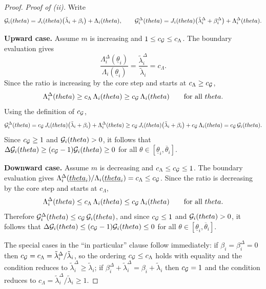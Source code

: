 \documentclass[master.tex]{subfiles}
\begin{document}
\begin{proof}
\noindent\textit{Proof of (ii).}
Write
\[
\mathcal{G}_i(theta) = J_i(theta)\bigl(\tilde\lambda_i+\beta_i\bigr)+\Lambda_i(theta), \qquad \mathcal{G}_i^\Delta(theta) = J_i(theta)\bigl(\tilde\lambda_i^\Delta+\beta_i^{\Delta}\bigr)+\Lambda_i^\Delta(theta).
\]


\noindent\textbf{Upward case.} Assume $m$ is increasing and $1\le c_{\mathcal{G}}\le c_\Lambda$. The boundary evaluation gives
\[
\frac{\Lambda_i^\Delta(\underline\theta_i)}{\Lambda_i(\underline\theta_i)} = \frac{\tilde\lambda_i^\Delta}{\tilde\lambda_i} = c_\Lambda.
\]
Since the ratio is increasing by the core step and starts at $c_\Lambda \ge c_{\mathcal{G}}$,
\[
\Lambda_i^\Delta(theta) \ge c_\Lambda\,\Lambda_i(theta) \ge c_{\mathcal{G}}\,\Lambda_i(theta) \qquad \text{for all }theta.
\]
Using the definition of $c_{\mathcal{G}}$,
\[
\mathcal{G}_i^\Delta(theta) = c_{\mathcal{G}}\,J_i(theta)\bigl(\tilde\lambda_i+\beta_i\bigr)+\Lambda_i^\Delta(theta) \ge c_{\mathcal{G}}\,J_i(theta)\bigl(\tilde\lambda_i+\beta_i\bigr)+c_{\mathcal{G}}\,\Lambda_i(theta) = c_{\mathcal{G}}\,\mathcal{G}_i(theta).
\]
Since $c_{\mathcal{G}}\ge 1$ and $\mathcal{G}_i(theta)>0$, it follows that $\Delta\mathcal{G}_i(theta) \ge (c_{\mathcal{G}}-1)\mathcal{G}_i(theta) \ge 0$ for all $\theta\in[\underline\theta_i,\overline\theta_i]$.


\noindent\textbf{Downward case.} Assume $m$ is decreasing and $c_\Lambda\le c_{\mathcal{G}}\le 1$. The boundary evaluation gives $\Lambda_i^\Delta(\underline{theta}_i)/\Lambda_i(\underline{theta}_i) = c_\Lambda \le c_{\mathcal{G}}$. Since the ratio is decreasing by the core step and starts at $c_\Lambda$,
\[
\Lambda_i^\Delta(theta) \le c_\Lambda\,\Lambda_i(theta) \le c_{\mathcal{G}}\,\Lambda_i(theta) \qquad \text{for all }theta.
\]
Therefore $\mathcal{G}_i^\Delta(theta) \le c_{\mathcal{G}}\,\mathcal{G}_i(theta)$, and since $c_{\mathcal{G}}\le 1$ and $\mathcal{G}_i(theta)>0$, it follows that $\Delta\mathcal{G}_i(theta) \le (c_{\mathcal{G}}-1)\mathcal{G}_i(theta) \le 0$ for all $\theta\in[\underline\theta_i,\overline\theta_i]$.


The special cases in the ``in particular'' clause follow immediately: if $\beta_i=\beta_i^{\Delta}=0$ then $c_{\mathcal{G}}=c_\Lambda=\tilde\lambda_i^\Delta/\tilde\lambda_i$, so the ordering $c_{\mathcal{G}}\le c_\Lambda$ holds with equality and the condition reduces to $\tilde\lambda_i^\Delta\ge\tilde\lambda_i$; if $\beta_i^{\Delta}+\tilde\lambda_i^\Delta=\beta_i+\tilde\lambda_i$ then $c_{\mathcal{G}}=1$ and the condition reduces to $c_\Lambda=\tilde\lambda_i^\Delta/\tilde\lambda_i\ge 1$.
\qedhere
\end{proof}

\end{document}
